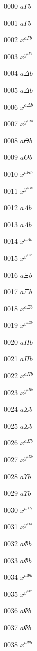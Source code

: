 \documentclass{article}
\begin{document}
0000 $a\Gamma b$\par
0001 $\displaystyle a\Gamma b$\par
0002 $x^{a\Gamma b}$\par
0003 $x^{y^{a\Gamma b}}$\par
0004 $a\Delta b$\par
0005 $\displaystyle a\Delta b$\par
0006 $x^{a\Delta b}$\par
0007 $x^{y^{a\Delta b}}$\par
0008 $a\Theta b$\par
0009 $\displaystyle a\Theta b$\par
0010 $x^{a\Theta b}$\par
0011 $x^{y^{a\Theta b}}$\par
0012 $a\Lambda b$\par
0013 $\displaystyle a\Lambda b$\par
0014 $x^{a\Lambda b}$\par
0015 $x^{y^{a\Lambda b}}$\par
0016 $a\Xi b$\par
0017 $\displaystyle a\Xi b$\par
0018 $x^{a\Xi b}$\par
0019 $x^{y^{a\Xi b}}$\par
0020 $a\Pi b$\par
0021 $\displaystyle a\Pi b$\par
0022 $x^{a\Pi b}$\par
0023 $x^{y^{a\Pi b}}$\par
0024 $a\Sigma b$\par
0025 $\displaystyle a\Sigma b$\par
0026 $x^{a\Sigma b}$\par
0027 $x^{y^{a\Sigma b}}$\par
0028 $a\Upsilon b$\par
0029 $\displaystyle a\Upsilon b$\par
0030 $x^{a\Upsilon b}$\par
0031 $x^{y^{a\Upsilon b}}$\par
0032 $a\Phi b$\par
0033 $\displaystyle a\Phi b$\par
0034 $x^{a\Phi b}$\par
0035 $x^{y^{a\Phi b}}$\par
0036 $a\Psi b$\par
0037 $\displaystyle a\Psi b$\par
0038 $x^{a\Psi b}$\par
\end{document}

